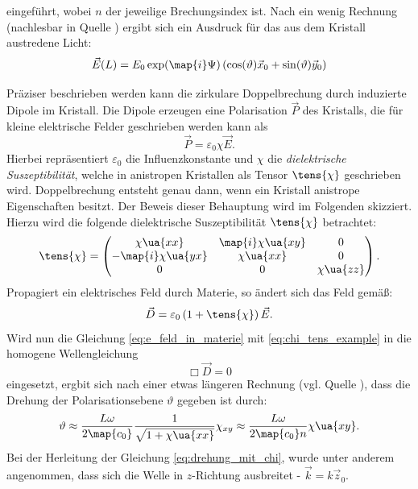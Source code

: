 eingeführt, wobei $n$ der jeweilige Brechungsindex ist.
Nach ein wenig Rechnung (nachlesbar in Quelle \cite{anleitungv46}) ergibt sich ein
Ausdruck für das aus dem Kristall austredene Licht:
\begin{equation*}
  \vec{E}(L)=E_0 \exp(\map{i}\Psi)\left(\cos(\vartheta) \vec{x}_0 + \sin(\vartheta)\vec{y}_0\right)
\end{equation*}

Präziser beschrieben werden kann die zirkulare Doppelbrechung durch induzierte
Dipole im Kristall. Die Dipole erzeugen eine Polarisation $\vec{P}$ des Kristalls,
die für kleine elektrische Felder geschrieben werden kann als
\begin{equation*}
\vec{P}=\varepsilon_0\chi\vec{E}.
\end{equation*}
Hierbei repräsentiert $\varepsilon_0$ die Influenzkonstante und $\chi$ die
\emph{dielektrische Suszeptibilität}, welche in anistropen Kristallen als
Tensor $\tens{\chi}$ geschrieben wird. Doppelbrechung entsteht genau dann, wenn
ein Kristall anistrope Eigenschaften besitzt. Der Beweis dieser Behauptung wird
im Folgenden skizziert. Hierzu wird die folgende dielektrische Suszeptibilität
 $\tens{\chi}$ betrachtet:
\begin{equation}
  \label{eq:chi_tens_example}
  \tens{\chi}=\begin{pmatrix} \chi\ua{xx} & \map{i}\chi\ua{xy} & 0 \\ -\map{i}\chi\ua{yx} & \chi\ua{xx} & 0 \\ 0 & 0 & \chi\ua{zz} \end{pmatrix}.
\end{equation}
Propagiert ein elektrisches Feld durch Materie, so ändert sich das Feld gemäß:
\begin{equation}
  \label{eq:e_feld_in_materie}
  \vec{D}=\varepsilon_0\left(1+\tens{\chi}\right)\vec{E}.
\end{equation}
Wird nun die Gleichung \eqref{eq:e_feld_in_materie} mit \eqref{eq:chi_tens_example}
in die homogene Wellengleichung
\begin{equation*}
  \Box \vec{D} = 0
\end{equation*}
eingesetzt, ergbit sich nach einer etwas längeren Rechnung (vgl. Quelle \cite{anleitungv46}),
dass die Drehung der Polarisationsebene $\vartheta$ gegeben ist durch:
\begin{equation}
  \label{eq:drehung_mit_chi}
  \vartheta \approx \frac{L\omega}{2\map{c_0}}\frac{1}{\sqrt{1+\chi\ua{xx}}}\chi_{xy}\approx\frac{L\omega}{2\map{c_0}n}\chi\ua{xy}.
\end{equation}
Bei der Herleitung der Gleichung \eqref{eq:drehung_mit_chi}, wurde unter anderem angenommen,
dass sich die Welle in $z$-Richtung ausbreitet - $\vec{k}=k\vec{z}_0$.
